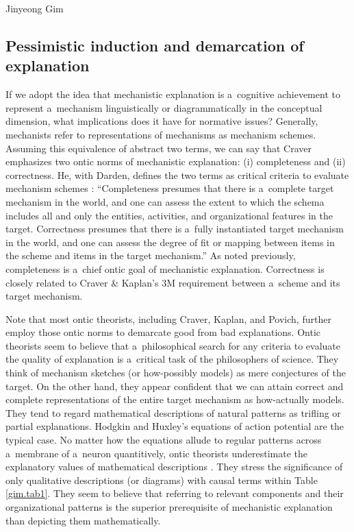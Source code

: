 \begin{artengenv}{Jinyeong Gim}
\subsection{Pessimistic induction and demarcation of explanation}

If we adopt the idea that mechanistic explanation is a~cognitive achievement to represent a~mechanism linguistically or diagrammatically in the conceptual dimension, what implications does it have for normative issues? Generally, mechanists refer to representations of mechanisms as mechanism schemes. Assuming this equivalence of abstract two terms, we can say that Craver emphasizes two ontic norms of mechanistic explanation: (i) completeness and (ii) correctness. He, with Darden, defines the two terms as critical criteria to evaluate mechanism schemes
\parencite[][p.9]{craver_search_2013}: %
 ``Completeness presumes that there is a~complete target mechanism in the world, and one can assess the extent to which the schema includes all and only the entities, activities, and organizational features in the target. Correctness presumes that there is a~fully instantiated target mechanism in the world, and one can assess the degree of fit or mapping between items in the scheme and items in the target mechanism.'' As noted previously, completeness is a~chief ontic goal of mechanistic explanation. Correctness is closely related to Craver \& Kaplan's 3M requirement between a~scheme and its target mechanism.

Note that most ontic theorists, including Craver, Kaplan, and Povich, further employ those ontic norms to demarcate good from bad explanations. Ontic theorists seem to believe that a~philosophical search for any criteria to evaluate the quality of explanation is a~critical task of the philosophers of science. They think of mechanism sketches (or how-possibly models) as mere conjectures of the target. On the other hand, they appear confident that we can attain correct and complete representations of the entire target mechanism as how-actually models. They tend to regard mathematical descriptions of natural patterns as trifling or partial explanations. Hodgkin and Huxley's equations of action potential are the typical case. No matter how the equations allude to regular patterns across a~membrane of a~neuron quantitively, ontic theorists underestimate the explanatory values of mathematical descriptions
\parencite[see][]{craver_explaining_2007}. %
 They stress the significance of only qualitative descriptions (or diagrams) with causal terms within Table \ref{gim.tab1}. They seem to believe that referring to relevant components and their organizational patterns is the superior prerequisite of mechanistic explanation than depicting them mathematically.


\end{artengenv}
